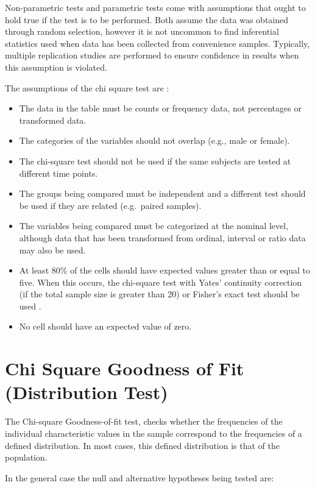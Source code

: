 \documentclass[
]{book}
\begin{document}
Non-parametric tests and parametric tests come with assumptions that ought to hold true if the test is to be performed. Both assume the data was obtained through random selection, however it is not uncommon to find inferential statistics used when data has been collected from convenience samples. Typically, multiple replication studies are performed to ensure confidence in results when this assumption is violated.

The assumptions of the chi square test are \citep{McHugh2013}:

\begin{itemize}
\item
  The data in the table must be counts or frequency data, not percentages or transformed data.
\item
  The categories of the variables should not overlap (e.g., male or female).
\item
  The chi-square test should not be used if the same subjects are tested at different time points.
\item
  The groups being compared must be independent and a different test should be used if they are related (e.g.~paired samples).
\item
  The variables being compared must be categorized at the nominal level, although data that has been transformed from ordinal, interval or ratio data may also be used.
\item
  At least 80\% of the cells should have expected values greater than or equal to five. When this occurs, the chi-square test with Yates' continuity correction (if the total sample size is greater than 20) or Fisher's exact test should be used \citep{chica}.
\item
  No cell should have an expected value of zero.
\end{itemize}

\hypertarget{chi-square-goodness-of-fit-distribution-test}{%
\section{Chi Square Goodness of Fit (Distribution Test)}\label{chi-square-goodness-of-fit-distribution-test}}

The Chi-square Goodness-of-fit test, checks whether the frequencies of the individual characteristic values in the sample correspond to the frequencies of a defined distribution. In most cases, this defined distribution is that of the population.

In the general case the null and alternative hypotheses being tested are:
\end{document}
